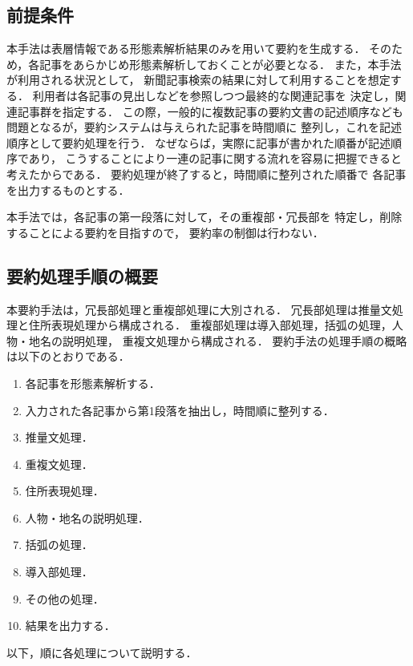 \subsection{前提条件}
本手法は表層情報である形態素解析結果のみを用いて要約を生成する．
そのため，各記事をあらかじめ形態素解析しておくことが必要となる．
また，本手法が利用される状況として，
新聞記事検索の結果に対して利用することを想定する．
利用者は各記事の見出しなどを参照しつつ最終的な関連記事を
決定し，関連記事群を指定する．
この際，一般的に複数記事の要約文書の記述順序なども
問題となるが，要約システムは与えられた記事を時間順に
整列し，これを記述順序として要約処理を行う．
なぜならば，実際に記事が書かれた順番が記述順序であり，
こうすることにより一連の記事に関する流れを容易に把握できると
考えたからである．
要約処理が終了すると，時間順に整列された順番で
各記事を出力するものとする．

本手法では，各記事の第一段落に対して，その重複部・冗長部を
特定し，削除することによる要約を目指すので，
要約率の制御は行わない．

\subsection{要約処理手順の概要}
本要約手法は，冗長部処理と重複部処理に大別される．
冗長部処理は推量文処理と住所表現処理から構成される．
重複部処理は導入部処理，括弧の処理，人物・地名の説明処理，
重複文処理から構成される．
要約手法の処理手順の概略は以下のとおりである．
\begin{enumerate}
 \item 各記事を形態素解析する．
 \item 入力された各記事から第1段落を抽出し，時間順に整列する．
 \item 推量文処理．
 \item 重複文処理．
 \item 住所表現処理．
 \item 人物・地名の説明処理．
 \item 括弧の処理．
 \item 導入部処理．
 \item その他の処理．
 \item 結果を出力する．
\end{enumerate}

以下，順に各処理について説明する．


